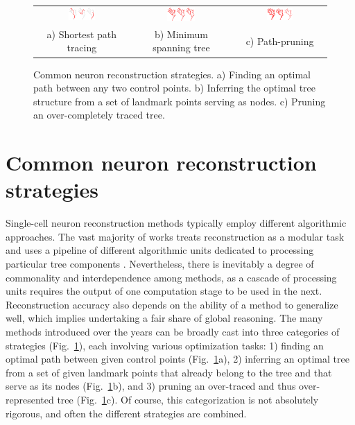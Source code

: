 \begin{figure}
	\centering
	\begin{tabular}{c@{\hspace{1em}}c@{\hspace{1em}}c@{\hspace{1em}}}
		\includegraphics[width=0.3\textwidth]{fig3a} & 
		\includegraphics[width=0.3\textwidth]{fig3b} & 
		\includegraphics[width=0.3\textwidth]{fig3c} \\
		a) Shortest path tracing & b) Minimum spanning tree & c) Path-pruning
	\end{tabular}
	\caption{Common neuron reconstruction strategies. a) Finding an optimal path between any two control points. b) Inferring the optimal tree structure from a set of landmark points serving as nodes. c) Pruning an over-completely traced tree.}
	\label{ch1:fig3}
\end{figure}

\section{Common neuron reconstruction strategies}
\label{sec:reconstructions}
Single-cell neuron reconstruction methods typically employ different algorithmic approaches. The vast majority of works treats reconstruction as a modular task and uses a pipeline of different algorithmic units dedicated to processing particular tree components \cite{meijering2010neuron}. Nevertheless, there is inevitably a degree of commonality and interdependence among methods, as a cascade of processing units requires the output of one computation stage to be used in the next. Reconstruction accuracy also depends on the ability of a method to generalize well, which implies undertaking a fair share of global reasoning. The many methods introduced over the years \cite{meijering2010neuron, donohue2011automated, acciai2016automated} can be broadly cast into three categories of strategies (Fig.~\ref{ch1:fig3}), each involving various optimization tasks: 1) finding an optimal path between given control points (Fig.~\ref{ch1:fig3}a), 2) inferring an optimal tree from a set of given landmark points that already belong to the tree and that serve as its nodes (Fig.~\ref{ch1:fig3}b), and 3) pruning an over-traced and thus over-represented tree (Fig.~\ref{ch1:fig3}c). Of course, this categorization is not absolutely rigorous, and often the different strategies are combined.

